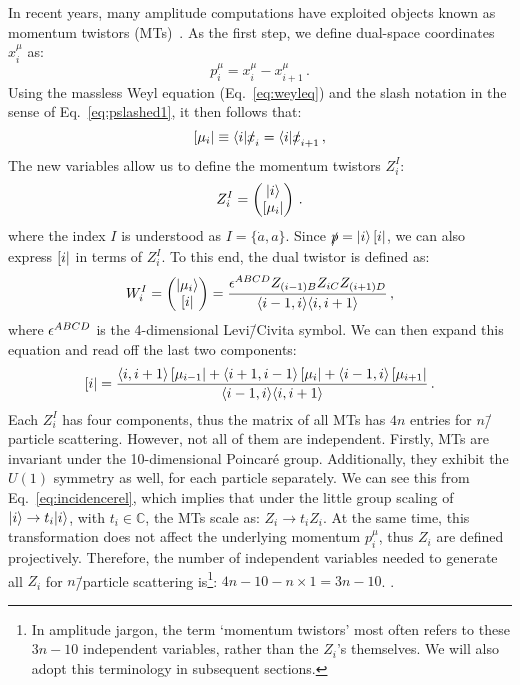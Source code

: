 \documentclass[main.tex]{subfiles}
\begin{document}
In recent years, many amplitude computations have exploited objects known as momentum twistors (MTs)~\cite{Hodges:2009hk, Badger:2013gxa, Badger:2016uuq}. As the first step, we define dual-space coordinates $x_i^\mu$ as:
\begin{equation} \label{eq:dualspacedef}
    p_i^\mu = x_i^\mu - x_{i+1}^\mu\,.
\end{equation}
Using the massless Weyl equation (Eq.~\ref{eq:weyleq}) and the slash notation in the sense of Eq.~\ref{eq:pslashed1}, it then follows that:
\begin{equation} \label{eq:incidencerel}
    \left[ \mu_i \right| \equiv \langle i|\slashed{x}_i = \langle i|\slashed{x}_{i+1}\,,
\end{equation}
The new variables allow us to define the momentum twistors $Z_i^I$:
\begin{equation} \label{eq:momtwistor}
    Z_i^I = 
    \begin{pmatrix}
        |i \rangle \\
        \left[ \mu_i \right| 
    \end{pmatrix}\,.
\end{equation}
where the index $I$ is understood as $I=\{\dot{a},a\}$. Since $\slashed{p} = |i \rangle\left[ i \right|$, we can also express $\left[ i \right|$ in terms of $Z_i^I$. To this end, the dual twistor is defined as:
\begin{equation} \label{eq:dualmomtwistor}
    W_i^I = 
    \begin{pmatrix}
        |\mu_i \rangle \\
        \left[ i \right|
    \end{pmatrix} = 
    \frac{\epsilon^{ABCD} Z_{(i-1)B} Z_{iC} Z_{(i+1)D}}{\langle i-1, i \rangle \langle i, i+1 \rangle}\,,
\end{equation}
where $\epsilon^{ABCD}$ is the 4-dimensional Levi\=/Civita symbol. We can then expand this equation and read off the last two components:
\begin{equation}
    \left[ i \right| = \frac{\langle i, i+1 \rangle\left[ \mu_{i-1} \right| + \langle i+1, i-1 \rangle\left[ \mu_i \right| + \langle i-1, i \rangle\left[ \mu_{i+1} \right| }{\langle i-1, i \rangle\langle i, i+1 \rangle}\,.
\end{equation}
Each $Z_i^I$ has four components, thus the matrix of all MTs has $4n$ entries for $n$\=/particle scattering. However, not all of them are independent. Firstly, MTs are invariant under the 10-dimensional Poincaré group. Additionally, they exhibit the $U(1)$ symmetry as well, for each particle separately. We can see this from Eq.~\ref{eq:incidencerel}, which implies that under the little group scaling of $|i \rangle\rightarrow t_i|i \rangle$, with $t_i \in \mathbb{C}$, the MTs scale as: $Z_i \rightarrow t_i Z_i$. At the same time, this transformation does not affect the underlying momentum $p_i^\mu$, thus $Z_i$ are defined projectively. Therefore, the number of independent variables needed to generate all $Z_i$ for $n$\=/particle scattering is\footnote{In amplitude jargon, the term `momentum twistors' most often refers to these $3n-10$ independent variables, rather than the $Z_i$'s themselves. We will also adopt this terminology in subsequent sections.}: $4n-10-n\times1 = 3n-10$.  .
\end{document}
